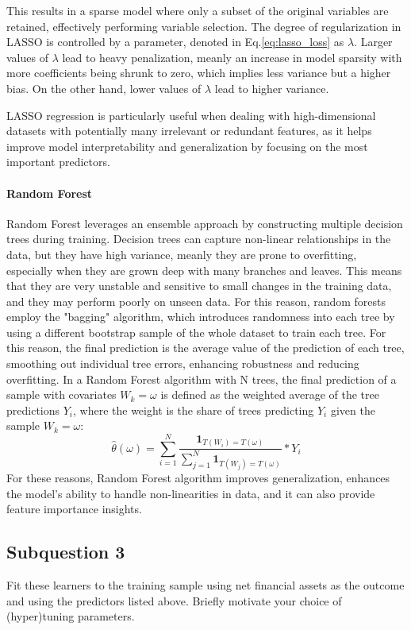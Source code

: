 \documentclass{article}
\begin{document}
	This results in a sparse model where only a subset of the original variables are retained, effectively performing variable selection.	
	The degree of regularization in LASSO is controlled by a parameter, denoted in Eq.\ref{eq:lasso_loss} as $\lambda$. Larger values of $\lambda$ lead to heavy penalization, meanly an increase in model sparsity with more coefficients being shrunk to zero, which implies less variance but a higher bias. On the other hand, lower values of $\lambda$ lead to higher variance.
	
	LASSO regression is particularly useful when dealing with high-dimensional datasets with potentially many irrelevant or redundant features, as it helps improve model interpretability and generalization by focusing on the most important predictors.
	
	\paragraph{Random Forest}
	Random Forest leverages an ensemble approach by constructing multiple decision trees during training. Decision trees can capture non-linear relationships in the data, but they have high variance, meanly they are  prone to overfitting, especially when they are grown deep with many branches and leaves. This means that they are very unstable and sensitive to small changes in the training data, and they may perform poorly on unseen data.
	For this reason, random forests employ the "bagging" algorithm, which introduces randomness into each tree by using a different bootstrap sample of the whole dataset to train each tree. For this reason, the final prediction is the average value of the prediction of each tree, smoothing out individual tree errors, enhancing robustness and reducing overfitting. In a Random Forest algorithm with N trees, the final prediction of a sample with covariates $W_k = \omega$ is defined as the weighted average of the tree predictions $Y_i$, where the weight is the share of trees predicting $Y_i$ given the sample $W_k = \omega$:
	\begin{equation}
		\hat{\theta}(\omega)= \sum_{i=1}^{N} \frac{\textbf{1}_{T(W_i)=T(\omega)}}{\sum_{j=1}^{N}\textbf{1}_{T(W_j)=T(\omega)}} * Y_i
	\end{equation}
	For these reasons, Random Forest algorithm improves generalization, enhances the model's ability to handle non-linearities in data, and it can also provide feature importance insights.
	
	\subsection{Subquestion 3}
	Fit these learners to the training sample using net financial assets as the outcome and using the predictors listed above. Briefly motivate your choice of (hyper)tuning parameters.
\end{document}
